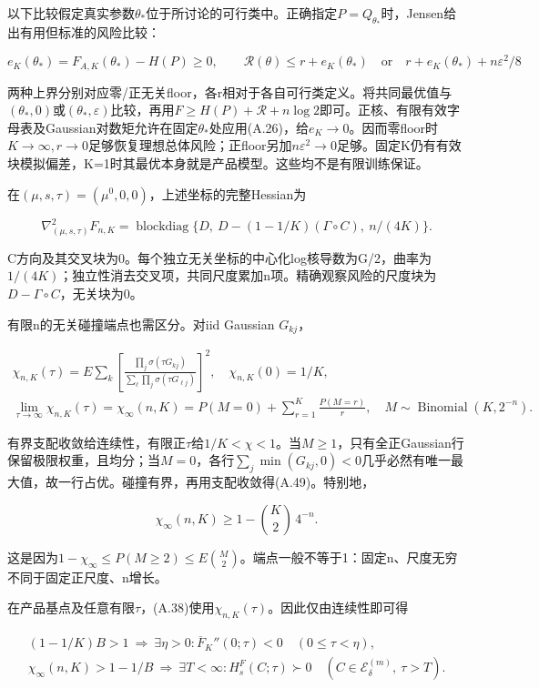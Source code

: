 \documentclass[11pt,a4paper]{article}
\begin{document}
以下比较假定真实参数\(\theta_*\)位于所讨论的可行类中。正确指定\(P=Q_{\theta_*}\)时，Jensen给出有用但标准的风险比较：

\[
e_K(\theta_*)=F_{A,K}(\theta_*)-H(P)\ge0,\qquad
\mathcal R(\theta)\le r+e_K(\theta_*)
\quad\text{or}\quad r+e_K(\theta_*)+n\varepsilon^2/8
\tag{A.47}
\]

两种上界分别对应零/正无关floor，各r相对于各自可行类定义。将共同最优值与\((\theta_*,0)\)或\((\theta_*,\varepsilon)\)比较，再用\(F\ge H(P)+\mathcal R+n\log2\)即可。正核、有限有效字母表及Gaussian对数矩允许在固定\(\theta_*\)处应用(A.26)，给\(e_K\to0\)。因而零floor时\(K\to\infty,r\to0\)足够恢复理想总体风险；正floor另加\(n\varepsilon^2\to0\)足够。固定K仍有有效块模拟偏差，K=1时其最优本身就是产品模型。这些均不是有限训练保证。

在\((\mu,s,\tau)=(\mu^0,0,0)\)，上述坐标的完整Hessian为

\[
\nabla^2_{(\mu,s,\tau)}F_{n,K}
=\operatorname{blockdiag}\{D,\ D-(1-1/K)(\Gamma\circ C),\ n/(4K)\}.
\tag{A.48}
\]

C方向及其交叉块为0。每个独立无关坐标的中心化log核导数为G/2，曲率为\(1/(4K)\)；独立性消去交叉项，共同尺度累加n项。精确观察风险的尺度块为\(D-\Gamma\circ C\)，无关块为0。

\newpage

有限n的无关碰撞端点也需区分。对iid Gaussian \(G_{kj}\)，

\[
\begin{gathered}
\chi_{n,K}(\tau)=E\sum_k\left[
\frac{\prod_j\sigma(\tau G_{kj})}{\sum_\ell\prod_j\sigma(\tau G_{\ell j})}\right]^2,
\quad \chi_{n,K}(0)=1/K,\\
\lim_{\tau\to\infty}\chi_{n,K}(\tau)
=\chi_\infty(n,K)=P(M=0)+\sum_{r=1}^K\frac{P(M=r)}r,
\quad M\sim\operatorname{Binomial}(K,2^{-n}).
\end{gathered}
\tag{A.49}
\]

有界支配收敛给连续性，有限正\(\tau\)给\(1/K<\chi<1\)。当\(M\ge1\)，只有全正Gaussian行保留极限权重，且均分；当\(M=0\)，各行\(\sum_j\min(G_{kj},0)<0\)几乎必然有唯一最大值，故一行占优。碰撞有界，再用支配收敛得(A.49)。特别地，

\[
\chi_\infty(n,K)\ge1-\binom K2\,4^{-n}.
\tag{A.50}
\]

这是因为\(1-\chi_\infty\le P(M\ge2)\le E\binom M2\)。端点一般不等于1：固定n、尺度无穷不同于固定正尺度、n增长。

在产品基点及任意有限\(\tau\)，(A.38)使用\(\chi_{n,K}(\tau)\)。因此仅由连续性即可得

\[
\begin{gathered}
(1-1/K)B>1\ \Longrightarrow\ \exists\eta>0:
\overline F_K''(0;\tau)<0\quad(0\le\tau<\eta),\\
\chi_\infty(n,K)>1-1/B\ \Longrightarrow\ \exists T<\infty:
H_s^F(C;\tau)\succ0\quad(C\in\mathcal E_\delta^{(m)},\ \tau>T).
\end{gathered}
\tag{A.51}
\]
\end{document}
